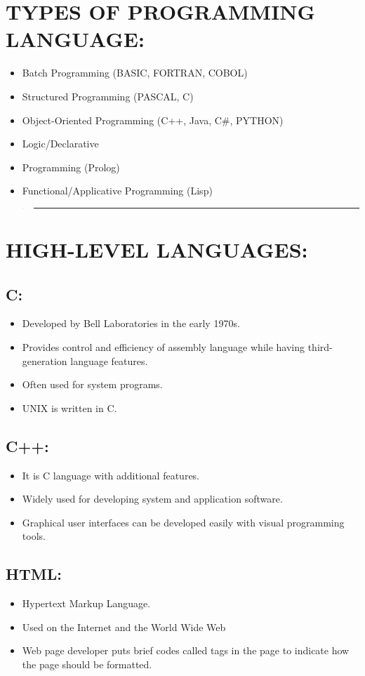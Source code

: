 \documentclass[10pt,english]{article}
\begin{document}
\section{TYPES OF PROGRAMMING LANGUAGE: }
\begin{itemize}
\item Batch Programming (BASIC, FORTRAN, COBOL) 
\item Structured Programming (PASCAL, C) 
\item Object-Oriented Programming (C++, Java, C\#, PYTHON) 
\item Logic/Declarative 
\item Programming (Prolog) 
\item Functional/Applicative Programming (Lisp)
\end{itemize}
\begin{verse}
\rule[0.5ex]{1\columnwidth}{1pt}
\end{verse}

\section{HIGH-LEVEL LANGUAGES: }

\subsection{C: }
\begin{itemize}
\item Developed by Bell Laboratories in the early 1970s. 
\item Provides control and efficiency of assembly language while having
third-generation language features. 
\item Often used for system programs. 
\item UNIX is written in C.
\end{itemize}

\subsection{C++: }
\begin{itemize}
\item It is C language with additional features. 
\item Widely used for developing system and application software. 
\item Graphical user interfaces can be developed easily with visual programming
tools. 
\end{itemize}

\subsection{HTML: }
\begin{itemize}
\item Hypertext Markup Language. 
\item Used on the Internet and the World Wide Web
\item Web page developer puts brief codes called tags in the page to indicate
how the page should be formatted.
\end{itemize}
\end{document}
